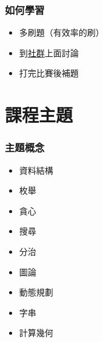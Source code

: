 \documentclass{beamer}
\begin{document}
\begin{frame}
    \frametitle{如何學習}
    \begin{itemize}
        \item 多刷題（有效率的刷）
        \item 到\href{https://discord.gg/cisc}{社群}上面討論
        \item 打完比賽後補題
    \end{itemize}
\end{frame}

\section{課程主題}

\begin{frame}
    \frametitle{主題概念}
    \begin{itemize}
        \item 資料結構
        \item 枚舉
        \item 貪心
        \item 搜尋
        \item 分治
        \item 圖論
        \item 動態規劃
        \item 字串
        \item 計算幾何
    \end{itemize}

    \vspace{0.5cm}
\end{frame}
\end{document}

